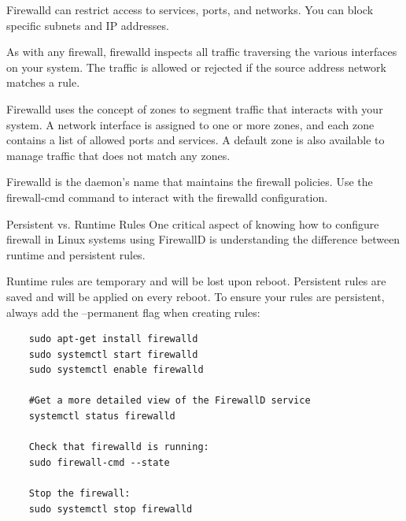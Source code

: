 Firewalld can restrict access to services, ports, and networks. You can block specific subnets and IP addresses.

As with any firewall, firewalld inspects all traffic traversing the various interfaces on your system. 
The traffic is allowed or rejected if the source address network matches a rule.

Firewalld uses the concept of zones to segment traffic that interacts with your system. 
A network interface is assigned to one or more zones, and each zone contains a list of allowed ports and services. 
A default zone is also available to manage traffic that does not match any zones.

Firewalld is the daemon's name that maintains the firewall policies. 
Use the firewall-cmd command to interact with the firewalld configuration.

Persistent vs. Runtime Rules
One critical aspect of knowing how to configure firewall in Linux systems using FirewallD is understanding 
the difference between runtime and persistent rules.

Runtime rules are temporary and will be lost upon reboot.
Persistent rules are saved and will be applied on every reboot.
To ensure your rules are persistent, always add the --permanent flag when creating rules:

\begin{lstlisting}
    sudo apt-get install firewalld 
    sudo systemctl start firewalld 
    sudo systemctl enable firewalld 

    #Get a more detailed view of the FirewallD service
    systemctl status firewalld

    Check that firewalld is running:
    sudo firewall-cmd --state 

    Stop the firewall: 
    sudo systemctl stop firewalld 
\end{lstlisting} 

